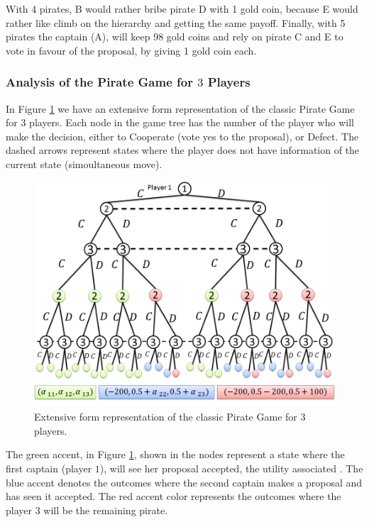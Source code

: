 With 4 pirates, B would rather bribe pirate D with 1 gold coin, because E would rather like climb on the hierarchy and getting the same payoff. Finally, with 5 pirates the captain (A), will keep 98 gold coins and rely on pirate C and E to vote in favour of the proposal, by giving 1 gold coin each.

\subsubsection{Analysis of the Pirate Game for $3$ Players}
\label{subsubsec:analysis_PG3players}

In Figure \ref{fig:pg_architecturegametree:extensiveform} we have an extensive form representation of the classic Pirate Game for $3$ players. Each node in the game tree has the number of the player who will make the decision, either to Cooperate (vote yes to the proposal), or Defect. The dashed arrows represent states where the player does not have information of the current state (simoultaneous move). 

\begin{figure}[h]
\centering 
\includegraphics[scale=0.60]{Figures/1.5qubit/FigurasRevistas/Slide1.png}
\caption{Extensive form representation of the classic Pirate Game for $3$ players. }
\label{fig:pg_architecturegametree:extensiveform}
\end{figure}

The green accent, in Figure \ref{fig:pg_architecturegametree:extensiveform}, shown in the nodes represent a state where the first captain (player $1$), will see her proposal accepted, the utility associated . The blue accent denotes the outcomes where the second captain makes a proposal and has seen it accepted. The red accent color represents the outcomes where the player $3$ will be the remaining pirate.

